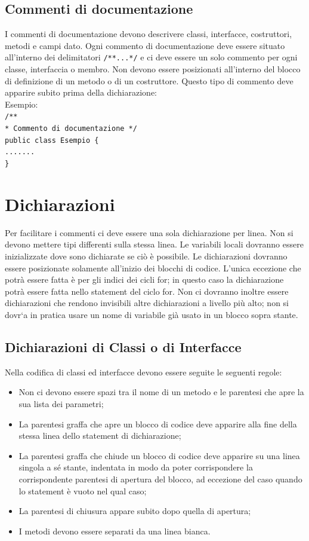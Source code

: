 \documentclass[11pt,titlepage,a4paper]{report}
\begin{document}
\subsection{Commenti di documentazione}
I commenti di documentazione devono descrivere classi, interfacce, costruttori, metodi e campi dato. Ogni commento di documentazione deve essere situato all'interno dei delimitatori \texttt{/**...*/} e ci deve essere un solo commento per ogni classe, interfaccia o membro. Non devono essere posizionati all'interno del blocco di definizione di un metodo o di un costruttore. Questo tipo di commento deve apparire subito prima della dichiarazione:\\
 \newline
Esempio:\\
 \newline
\texttt{/** \\
* Commento di documentazione \newline
 */ \\
public class Esempio \{ \\
    ....... \\
\}} \\
 \newline
\section{Dichiarazioni}
Per facilitare i commenti ci deve essere una sola dichiarazione per linea. Non si devono mettere tipi differenti sulla stessa linea. Le variabili locali dovranno essere inizializzate dove sono dichiarate se ci\`o \`e possibile. Le dichiarazioni dovranno essere posizionate solamente all'inizio dei blocchi di codice. L'unica eccezione che potr\`a essere fatta è per gli indici dei cicli for; in questo caso la dichiarazione potr\`a essere fatta nello statement del ciclo for. Non ci dovranno inoltre essere dichiarazioni che rendono invisibili altre dichiarazioni a livello più alto; non si dovr`a in pratica usare un nome di variabile già usato in un blocco sopra stante.
\subsection{Dichiarazioni di Classi o di Interfacce}
Nella codifica di classi ed interfacce devono essere seguite le seguenti regole:
\begin{itemize}
\item Non ci devono essere spazi tra il nome di un metodo e le parentesi che apre la sua lista dei parametri;
\item La parentesi graffa che apre un blocco di codice deve apparire alla fine della stessa linea dello statement di dichiarazione;
\item La parentesi graffa che chiude un blocco di codice deve apparire su una linea singola a sé stante, indentata in modo da poter corrispondere la corrispondente parentesi di apertura del blocco, ad eccezione del caso quando lo statement è vuoto nel qual caso;
\item La parentesi di chiusura appare subito dopo quella di apertura;
\item I metodi devono essere separati da una linea bianca.
\end{itemize}
\end{document}
